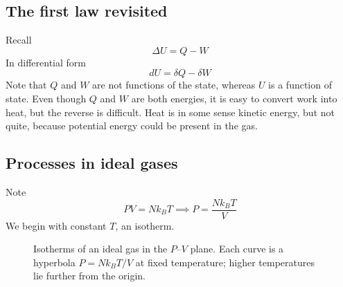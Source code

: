 \documentclass{report}
\numberwithin{equation}{section}
\begin{document}
\subsection{The first law revisited}
Recall
\begin{equation*}
    \Delta U = Q - W
\end{equation*}
In differential form
\begin{equation*}
    dU = \delta Q - \delta W
\end{equation*}
Note that $Q$ and $W$ are not functions of the state, whereas $U$ is a function of state. Even though $Q$ and $W$ are both energies, it is easy to convert work into heat, but the reverse is difficult. Heat is in some sense kinetic energy, but not quite, because potential energy could be present in the gas.
\subsection{Processes in ideal gases}
Note
\begin{equation*}
    PV = Nk_BT \implies P = \frac{Nk_BT}{V}
\end{equation*}
We begin with constant $T$, an isotherm.

\begin{figure}[H]
\centering
{}
\caption{Isotherms of an ideal gas in the $P$--$V$ plane. Each curve is a
hyperbola $P = Nk_BT/V$ at fixed temperature; higher temperatures lie further
from the origin.}
\label{fig:isotherms}
\end{figure}
\end{document}
